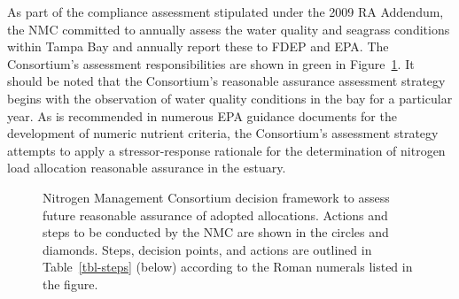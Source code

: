 \documentclass[
  letterpaper,
  DIV=11,
  numbers=noendperiod]{scrreport}
\begin{document}
As part of the compliance assessment stipulated under the 2009 RA
Addendum, the NMC committed to annually assess the water quality and
seagrass conditions within Tampa Bay and annually report these to FDEP
and EPA. The Consortium's assessment responsibilities are shown in green
in Figure~\ref{fig-decision}. It should be noted that the Consortium's
reasonable assurance assessment strategy begins with the observation of
water quality conditions in the bay for a particular year. As is
recommended in numerous EPA guidance documents for the development of
numeric nutrient criteria, the Consortium's assessment strategy attempts
to apply a stressor-response rationale for the determination of nitrogen
load allocation reasonable assurance in the estuary.

\begin{figure}


\caption{\label{fig-decision}Nitrogen Management Consortium decision
framework to assess future reasonable assurance of adopted allocations.
Actions and steps to be conducted by the NMC are shown in the circles
and diamonds. Steps, decision points, and actions are outlined in
Table~\ref{tbl-steps} (below) according to the Roman numerals listed in
the figure.}

\end{figure}%
\end{document}
